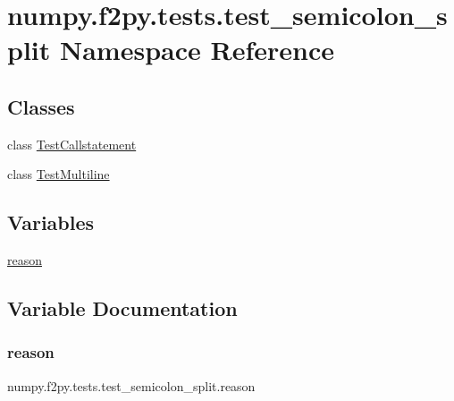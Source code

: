 \hypertarget{namespacenumpy_1_1f2py_1_1tests_1_1test__semicolon__split}{}\section{numpy.\+f2py.\+tests.\+test\+\_\+semicolon\+\_\+split Namespace Reference}
\label{namespacenumpy_1_1f2py_1_1tests_1_1test__semicolon__split}
\subsection*{Classes}
\begin{DoxyCompactItemize}
\item 
class \hyperlink{classnumpy_1_1f2py_1_1tests_1_1test__semicolon__split_1_1TestCallstatement}{Test\+Callstatement}
\item 
class \hyperlink{classnumpy_1_1f2py_1_1tests_1_1test__semicolon__split_1_1TestMultiline}{Test\+Multiline}
\end{DoxyCompactItemize}
\subsection*{Variables}
\begin{DoxyCompactItemize}
\item 
\hyperlink{namespacenumpy_1_1f2py_1_1tests_1_1test__semicolon__split_a292972b0f388c5b31198930677feaff5}{reason}
\end{DoxyCompactItemize}


\subsection{Variable Documentation}
\mbox{\label{namespacenumpy_1_1f2py_1_1tests_1_1test__semicolon__split_a292972b0f388c5b31198930677feaff5}} 
\subsubsection{\texorpdfstring{reason}{reason}}
{\footnotesize\ttfamily numpy.\+f2py.\+tests.\+test\+\_\+semicolon\+\_\+split.\+reason}

